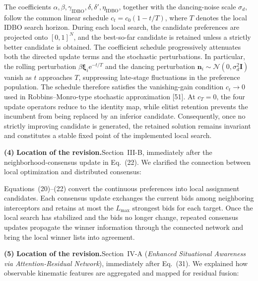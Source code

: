 \documentclass[11pt]{article}
\newcommand{\hladd}[1]{{\color{addblue}#1}}
\newcommand{\loc}{\medskip\noindent\textbf{Location of the revision.}\quad}
\begin{document}
\begin{tcolorbox}[enhanced,breakable,colback=white,colframe=addblue!55,
coltext=addblue,fontupper=\color{addblue},boxrule=0.6pt,arc=2pt,
left=9pt,right=9pt,top=7pt,bottom=7pt]
The coefficients
$\alpha,\beta,\gamma_{\mathrm{IDBO}},\delta,\delta',
\eta_{\mathrm{IDBO}}$, together with the dancing-noise scale $\sigma_d$,
follow the common linear schedule $c_t=c_0(1-t/T)$, where $T$ denotes the
local IDBO search horizon. During each local search, the candidate
preferences are projected onto $[0,1]^N$, and the best-so-far candidate is
retained unless a strictly better candidate is obtained. The coefficient
schedule progressively attenuates both the directed update terms and the
stochastic perturbations. In particular, the rolling perturbation
$\beta\boldsymbol{\xi}_i\mathrm{e}^{-t/T}$ and the dancing perturbation
$\mathbf{n}_i\sim\mathcal{N}(0,\sigma_d^2\mathbf{I})$ vanish as $t$
approaches $T$, suppressing late-stage fluctuations in the preference
population. The schedule therefore satisfies the vanishing-gain condition
$c_t\to0$ used in Robbins--Monro-type stochastic approximation
[51]. At $c_T=0$, the four update operators reduce
to the identity map, while elitist retention prevents the incumbent from
being replaced by an inferior candidate. Consequently, once no strictly
improving candidate is generated, the retained solution remains invariant
and constitutes a stable fixed point of the implemented local search.
\end{tcolorbox}

\medskip
\noindent\textbf{(4)}
\loc Section~III-B, immediately after the neighborhood-consensus update in
Eq.~(22). We clarified the connection between local optimization and
distributed consensus:

\begin{tcolorbox}[enhanced,breakable,colback=white,colframe=addblue!55,
boxrule=0.6pt,arc=2pt,left=9pt,right=9pt,top=7pt,bottom=7pt]
\hladd{Equations~(20)--(22) convert the continuous preferences into local assignment candidates. Each
consensus update exchanges the current bids among neighboring interceptors
and retains at most the $L_{\max}$ strongest bids for each target. Once the
local search has stabilized and the bids no longer change, repeated consensus
updates propagate the winner information through the connected network and
bring the local winner lists into agreement.}
\end{tcolorbox}

\medskip
\noindent\textbf{(5)}
\loc Section~IV-A (\emph{Enhanced Situational Awareness via
Attention-Residual Network}), immediately after Eq.~(31). We explained how
observable kinematic features are aggregated and mapped for residual fusion:
\end{document}
